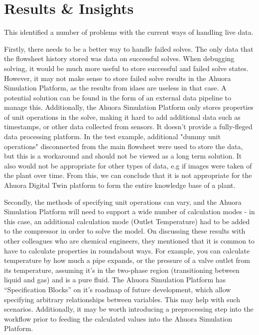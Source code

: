 \section{Results \& Insights}

This identified a number of problems with the current ways of handling live data.

Firstly, there needs to be a better way to handle failed solves. The only data that the flowsheet history stored was data on successful solves. When debugging solving, it would be much more useful to store successful and failed solve states. However, it may not make sense to store failed solve results in the Ahuora Simulation Platform, as the results from idaes are useless in that case. 
A potential solution can be found in the form of an external data pipeline to manage this.
Additionally, the Ahuora Simulation Platform only stores properties of unit operations in the solve, making it hard to add additional data such as timestamps, or other data collected from sensors. It doesn't provide a fully-fleged data processing platform. 
In the test example, additional "dummy unit operations" disconnected from the main flowsheet were used to store the data, but this is a workaround and should not be viewed as a long term solution.
It also would not be appropriate for other types of data, e.g if images were taken of the plant over time. From this, we can conclude that it is not appropriate for the Ahuora Digital Twin platform to form the entire knowledge base of a plant.

Secondly, the methods of specifying unit operations can vary, and the Ahuora Simulation Platform will need to support a wide number of calculation modes - in this case, an additional calculation mode (Outlet Temperature) had to be added to the compressor in order to solve the model. On discussing these results with other colleagues who are chemical engineers, they mentioned that it is common to have to calculate properties in roundabout ways. 
For example, you can calculate temperature by how much a pipe expands, or the pressure of a valve outlet from its temperature, assuming it's in the two-phase region (transitioning between liquid and gas) and is a pure fluid. The Ahuora Simulation Platform has ``Specification Blocks'' on it's roadmap of future development, which allow specifying arbitrary relationships between variables. This may help with such scenarios. Additionally, it may be worth introducing a preprocessing step into the workflow prior to feeding the calculated values into the Ahuora Simulation Platform.

